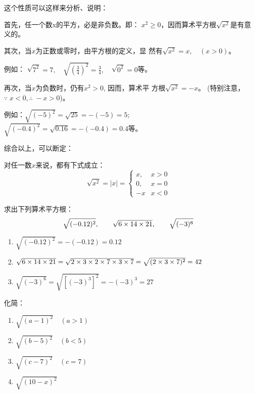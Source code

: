 这个性质可以这样来分析、说明：

首先，任一个数x的平方，必是非负数。即：
$x^2\ge 0$，因而算术平方根$\sqrt{x^2}$是有意义的。

其次，当$x$为正数或零时，由平方根的定义，显
然有$\sqrt{x^2}=x,\quad (x>0)$。

例如：
$\sqrt{7^2}=7,\quad\sqrt{\left(\frac{3}{4}\right)^2}=\frac{3}{4},\quad \sqrt{0^2}=0$等。


再次，当$x$为负数时，仍有$x^2>0$, 因而，算术平
方根$\sqrt{x^2}=-x$。 (特别注意，$\because\; x<0, \therefore\; -x>0$)。

例如：$\sqrt{(-5)^2}=\sqrt{25}=-(-5)=5$; 
$\sqrt{(-0.4)^2}=\sqrt{0.16}=-(-0.4)=0.4$等。

综合以上，可以断定：

对任一数$x$来说，都有下式成立：
\[\sqrt{x^2}=|x|=\begin{cases}
    x,& x>0\\
    0, &x=0\\
    -x & x<0
\end{cases}\]


\begin{example}
    求出下列算术平方根：
\[ \sqrt{(-0.12)^2},\qquad \sqrt{6\times 14\times 21},\qquad \sqrt{(-3)^6} \]
\end{example}

\begin{solution}
\begin{enumerate}
    \item $ \sqrt{(-0.12)^2}=-(-0.12)=0.12$
    \item $\sqrt{6\times 14\times 21}=\sqrt{2\times3\times2\times7\times3\times7}=\sqrt{(2\times3\times7)^2}=42$
    \item $\sqrt{(-3)^6}=\sqrt{[(-3)^3]^2}=-(-3)^3=27$
\end{enumerate}
\end{solution}

\begin{example}
    化简：
\begin{multicols}{2}
\begin{enumerate}
    \item $\sqrt{(a-1)^{2}}\quad (a>1)$
    \item $\sqrt{(b-5)^{2}}\quad (b<5)$
    \item $\sqrt{(c-7)^{2}}\quad (c=7)$
    \item $\sqrt{(10-x)^{2}}$
\end{enumerate}
\end{multicols}
\end{example}

